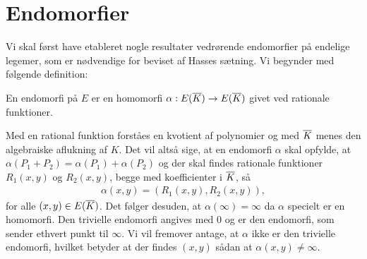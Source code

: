 \section{Endomorfier}
Vi skal først have etableret nogle resultater vedrørende endomorfier på endelige legemer, som
er nødvendige for beviset af Hasses sætning. Vi begynder med følgende definition:

\begin{definition}
En endomorfi på $E$ er en homomorfi $\alpha : E(\overline{K}) \to E(\overline{K})$ givet
ved rationale funktioner.
\end{definition}

Med en rational funktion forståes en kvotient af polynomier og med $\overline{K}$ menes den algebraiske
aflukning af $K$. Det vil altså sige, at 
en endomorfi $\alpha$ skal opfylde, at $\alpha(P_1 + P_2) = \alpha(P_1) + \alpha(P_2)$ 
og der skal findes rationale 
funktioner $R_1(x, y)$ og $R_2(x, y)$, begge med koefficienter i $\overline{K}$, så
\begin{align*}
	\alpha(x, y) = (R_1(x, y), R_2(x, y)),
\end{align*}
for alle $(x, y) \in E(\overline{K})$. Det følger desuden, at $\alpha(\infty) = \infty$ da 
$\alpha$ specielt er en homomorfi. Den trivielle endomorfi angives med $0$ og er den endomorfi, som sender ethvert punkt til $\infty$. Vi vil fremover antage, at $\alpha$ ikke er den trivielle endomorfi, hvilket betyder at der findes $(x, y)$ sådan at $\alpha(x, y) \neq \infty$.

